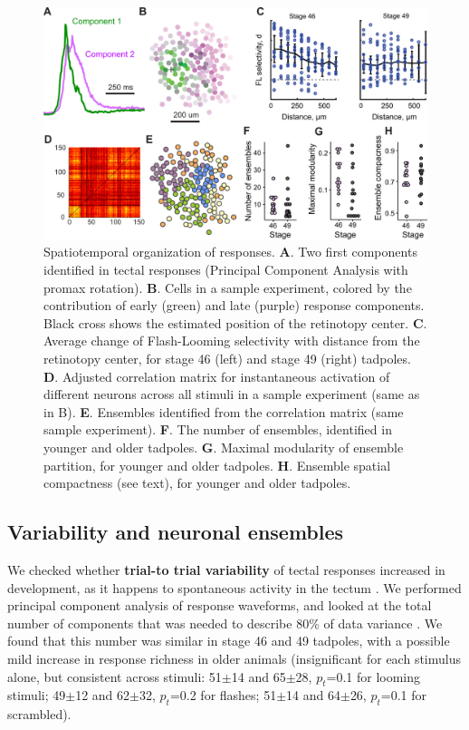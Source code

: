 \documentclass{article}
\begin{document}
\begin{figure}[t!]
\includegraphics[width=\linewidth]{fig3.pdf}
\caption{
Spatiotemporal organization of responses. \textbf{A}. Two first components identified in tectal responses (Principal Component Analysis with promax rotation).  \textbf{B}. Cells in a sample experiment, colored by the contribution of early (green) and late (purple) response components. Black cross shows the estimated position of the retinotopy center. \textbf{C}. Average change of Flash-Looming selectivity with distance from the retinotopy center, for stage 46 (left) and stage 49 (right) tadpoles. \textbf{D}. Adjusted correlation matrix for instantaneous activation of different neurons across all stimuli in a sample experiment (same as in B). \textbf{E}. Ensembles identified from the correlation matrix (same sample experiment). \textbf{F}. The number of ensembles, identified in younger and older tadpoles. \textbf{G}. Maximal modularity of ensemble partition, for younger and older tadpoles. \textbf{H}. Ensemble spatial compactness (see text), for younger and older tadpoles.}
\end{figure}

\subsection*{Variability and neuronal ensembles}

We checked whether \textbf{trial-to trial variability} of tectal responses increased in development, as it happens to spontaneous activity in the tectum \citep{xu2011}. We performed principal component analysis of response waveforms, and looked at the total number of components that was needed to describe 80\% of data variance \citep{avitan2017spontaneous}. We found that this number was similar in stage 46 and 49 tadpoles, with a possible mild increase in response richness in older animals (insignificant for each stimulus alone, but consistent across stimuli: 51$\pm$14 and 65$\pm$28, $p_t$=0.1 for looming stimuli; 49$\pm$12 and 62$\pm$32, $p_t$=0.2 for flashes; 51$\pm$14 and 64$\pm$26, $p_t$=0.1 for scrambled).
\end{document}
